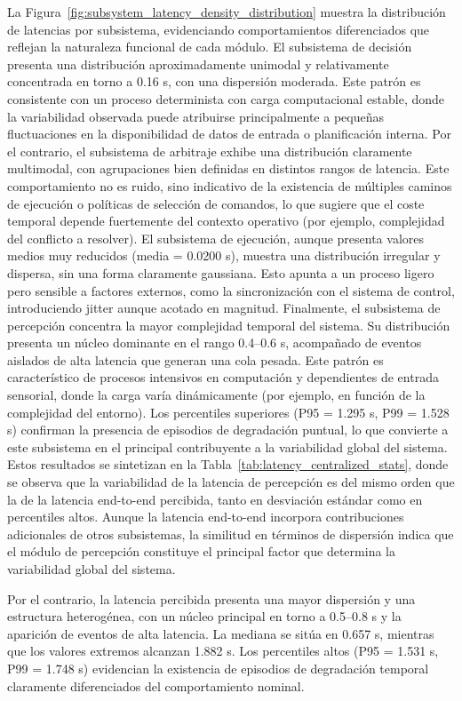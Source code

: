 La Figura~\ref{fig:subsystem_latency_density_distribution} muestra la distribución de latencias por subsistema, evidenciando comportamientos diferenciados que reflejan la naturaleza funcional de cada módulo.
El subsistema de decisión presenta una distribución aproximadamente unimodal y relativamente concentrada en torno a 0.16 s, con una dispersión moderada. Este patrón es consistente con un proceso determinista con carga computacional estable, donde la variabilidad observada puede atribuirse principalmente a pequeñas fluctuaciones en la disponibilidad de datos de entrada o planificación interna.
Por el contrario, el subsistema de arbitraje exhibe una distribución claramente multimodal, con agrupaciones bien definidas en distintos rangos de latencia. Este comportamiento no es ruido, sino indicativo de la existencia de múltiples caminos de ejecución o políticas de selección de comandos, lo que sugiere que el coste temporal depende fuertemente del contexto operativo (por ejemplo, complejidad del conflicto a resolver).
El subsistema de ejecución, aunque presenta valores medios muy reducidos (media = 0.0200 s), muestra una distribución irregular y dispersa, sin una forma claramente gaussiana. Esto apunta a un proceso ligero pero sensible a factores externos, como la sincronización con el sistema de control, introduciendo jitter aunque acotado en magnitud.
Finalmente, el subsistema de percepción concentra la mayor complejidad temporal del sistema. Su distribución presenta un núcleo dominante en el rango 0.4--0.6 s, acompañado de eventos aislados de alta latencia que generan una cola pesada. Este patrón es característico de procesos intensivos en computación y dependientes de entrada sensorial, donde la carga varía dinámicamente (por ejemplo, en función de la complejidad del entorno). Los percentiles superiores (P95 = 1.295 s, P99 = 1.528 s) confirman la presencia de episodios de degradación puntual, lo que convierte a este subsistema en el principal contribuyente a la variabilidad global del sistema.
Estos resultados se sintetizan en la Tabla~\ref{tab:latency_centralized_stats}, donde se observa que la variabilidad de la latencia de percepción es del mismo orden que la de la latencia end-to-end percibida, tanto en desviación estándar como en percentiles altos. 
Aunque la latencia end-to-end incorpora contribuciones adicionales de otros subsistemas, la similitud en términos de dispersión indica que el módulo de percepción constituye el principal factor que determina la variabilidad global del sistema.

Por el contrario, la latencia percibida presenta una mayor dispersión y una estructura heterogénea, 
con un núcleo principal en torno a 0.5--0.8 s y la aparición de eventos de alta latencia. La mediana se sitúa en 0.657 s, 
mientras que los valores extremos alcanzan 1.882 s. Los percentiles altos (P95 = 1.531 s, P99 = 1.748 s) evidencian 
la existencia de episodios de degradación temporal claramente diferenciados del comportamiento nominal.

